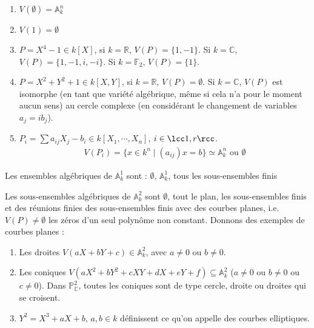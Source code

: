             \begin{expl}
                \begin{enumerate}
                    \item $V(\emptyset) = \mathbb{A}_k^n$
                    \item $V(1) = \emptyset$
                    \item $P = X^4 - 1 \in k[X]$, si $k = \mathbb{R}$, $V(P) = \{1, -1\}$. Si $k = \mathbb{C}$, $V(P) = \{1,-1,i,-i\}$. Si $k = \mathbb{F}_2$, $V(P) = \{1\}$.
                    \item $P = X^2 + Y^2 + 1 \in k[X,Y]$, si $k = \mathbb{R}$, $V(P) = \emptyset$. Si $k = \mathbb{C}$, $V(P)$ est isomorphe (en tant que variété algébrique, même si cela n'a pour le moment aucun sens) au cercle complexe (en considérant le changement de variables $a_j = ib_j$).
                    \item $P_i = \sum a_{ij} X_j - b_i \in k[X_1, \cdots, X_n]$, $i \in \lcc 1,r \rcc$.
                    \begin{align*}
                        V(P_i) = \{x \in k^n \mid (a_{ij})x = b\} \simeq \mathbb{A}_k^n \text{ ou } \emptyset
                    \end{align*}
                \end{enumerate}
            \end{expl}
            \begin{exo}
                Les ensembles algébriques de $\mathbb{A}^1_k$ sont : $\emptyset$, $\mathbb{A}_k^1$, tous les sous-ensembles finis 
            \end{exo}
            \begin{expl}
                Les sous-ensembles algébriques de $\mathbb{A}^2_k$ sont $\emptyset$, tout le plan, les sous-ensembles finis et des réunions finies des sous-ensembles finis avec des courbes planes, i.e. $V(P) \neq \emptyset$ les zéros d'un seul polynôme non constant. Donnons des exemples de courbes planes :
                \begin{enumerate}
                    \item Les droites $V(aX + bY + c) \in \mathbb{A}_k^2$, avec $a \neq 0$ ou $b \neq 0$.
                    \item Les coniques $V(aX^2 + bY^2 + cXY + dX + eY + f) \subseteq \mathbb{A}_k^2$ ($a \neq 0$ ou $b \neq 0$ ou $c \neq 0$). Dans $\mathbb{P}_\mathbb{C}^2$, toutes les coniques sont de type cercle, droite ou droites qui se croisent.
                    \item $Y^2 = X^3 + aX + b$, $a,b \in k$ définissent ce qu'on appelle des courbes elliptiques.
                \end{enumerate}
            \end{expl}
